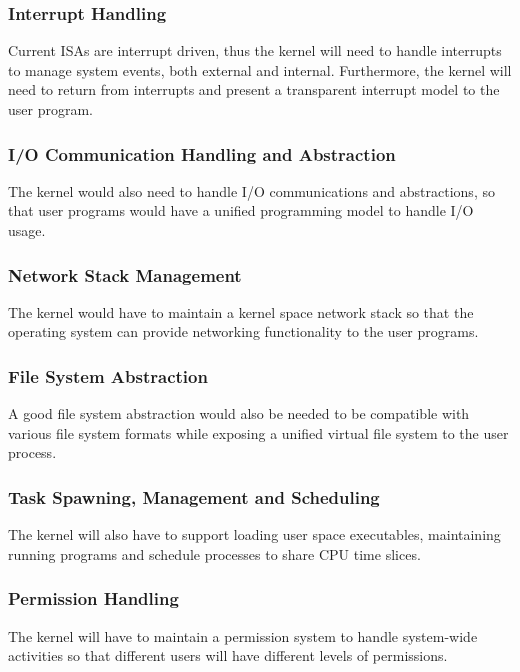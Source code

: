 \documentclass[conference]{IEEEtran}
\begin{document}
\subsubsection{Interrupt Handling}

Current ISAs are interrupt driven, thus the kernel will need to handle interrupts to manage system events, both external and internal. Furthermore, the kernel will need to return from interrupts and present a transparent interrupt model to the user program.

\subsubsection{I/O Communication Handling and Abstraction}

The kernel would also need to handle I/O communications and abstractions, so that user programs would have a unified programming model to handle I/O usage.

\subsubsection{Network Stack Management}

The kernel would have to maintain a kernel space network stack so that the operating system can provide networking functionality to the user programs.

\subsubsection{File System Abstraction}

A good file system abstraction would also be needed to be compatible with various file system formats while exposing a unified virtual file system to the user process.

\subsubsection{Task Spawning, Management and Scheduling}

The kernel will also have to support loading user space executables, maintaining running programs and schedule processes to share CPU time slices.

\subsubsection{Permission Handling}

The kernel will have to maintain a permission system to handle system-wide activities so that different users will have different levels of permissions.
\end{document}

